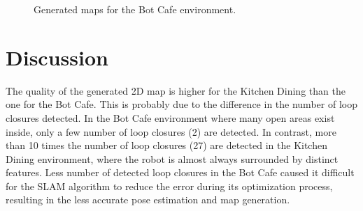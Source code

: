 \documentclass[10pt,journal,compsoc]{IEEEtran}
\begin{document}
\begin{figure}[thpb]
      \centering
      \vfill
      \caption{Generated maps for the Bot Cafe environment.}
      \label{fig:result-personal}
\end{figure}

\section{Discussion}
The quality of the generated 2D map is higher for the Kitchen Dining than the one for the Bot Cafe. This is probably due to the difference in the number of loop closures detected. In the Bot Cafe environment where many open areas exist inside, only a few number of loop closures (2) are detected. In contrast, more than 10 times the number of loop closures (27) are detected in the Kitchen Dining environment, where the robot is almost always surrounded by distinct features. Less number of detected loop closures in the Bot Cafe caused it difficult for the SLAM algorithm to reduce the error during its optimization process, resulting in the less accurate pose estimation and map generation.
\end{document}
